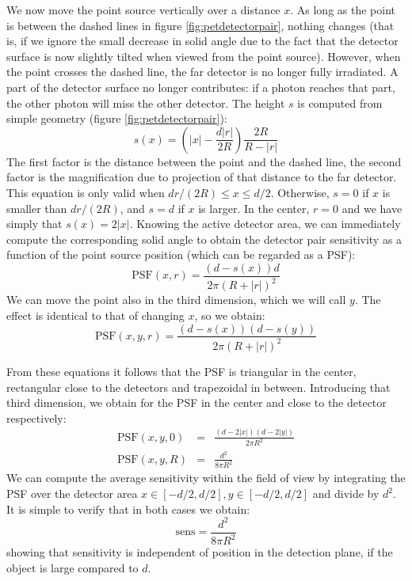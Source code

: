 We now move the point source vertically over a distance $x$. As long as the
point is between the dashed lines in figure \ref{fig:petdetectorpair}, nothing
changes (that is, if we ignore the small decrease in solid angle due to the
fact that the detector surface is now slightly tilted when viewed from the
point source). However, when the point crosses the dashed line, the far
detector is no longer fully irradiated. A part of the detector surface no
longer contributes: if a photon reaches that part, the other photon will miss
the other detector. The height $s$ is computed from simple geometry (figure
\ref{fig:petdetectorpair}):
\begin{equation}
  s(x) = \left( |x| - \frac{d |r|}{2 R} \right) \frac{2R}{R-|r|}
\end{equation}
The first factor is the distance between the point and the dashed line, the
second factor is the magnification due to projection of that distance to the
far detector. This equation is only valid when $d r / (2R) \leq x \leq
d/2$. Otherwise, $s = 0$ if $x$ is smaller than $dr/(2R)$, and $s = d$ if $x$
is larger. In the center, $r = 0$ and we have simply that $s(x) = 2 |x|$.
Knowing the active detector area, we can immediately compute the
corresponding solid angle to obtain the detector pair sensitivity as a
function of the point source position (which can be regarded as a PSF):
\begin{equation}
 \mbox{PSF}(x, r) = \frac{(d - s(x)) d}{2 \pi (R+|r|)^2}
\end{equation}
We can move the point also in the third dimension, which we will call $y$. The
effect is identical to that of changing $x$, so we obtain:
\begin{equation}
 \mbox{PSF}(x, y, r) = \frac{(d - s(x)) (d - s(y))}{2 \pi (R+|r|)^2}
\end{equation}

From these equations it follows that the PSF is triangular in the center,
rectangular close to the detectors and trapezoidal in between.  Introducing
that third dimension, we obtain for the PSF in the center and close to the
detector respectively:
\begin{eqnarray}
  \mbox{PSF}(x, y, 0) & = & \frac{(d - 2|x|)(d - 2 |y|)}{2 \pi R^2}\\
  \mbox{PSF}(x, y, R) & = & \frac{d^2}{8 \pi R^2}
\end{eqnarray}
We can compute the average sensitivity within the field of view by integrating
the PSF over the detector area $x \in [-d/2, d/2], y \in [-d/2,
d/2]$ and divide by $d^2$. It is simple to verify that in both cases we obtain:
\begin{equation}
  \mbox{sens} = \frac{d^2}{8 \pi R^2} \label{eq:pet_totsens}
\end{equation}
showing that sensitivity is independent of position in the detection plane, if
the object is large compared to $d$.

